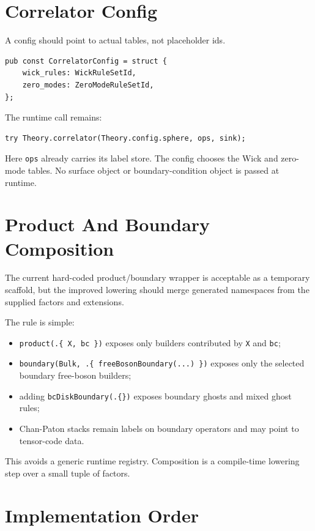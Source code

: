 \documentclass[11pt]{article}
\begin{document}
\section{Correlator Config}
\label{sec:orgd717ccc}

A config should point to actual tables, not placeholder ids.

\begin{verbatim}
pub const CorrelatorConfig = struct {
    wick_rules: WickRuleSetId,
    zero_modes: ZeroModeRuleSetId,
};
\end{verbatim}

The runtime call remains:

\begin{verbatim}
try Theory.correlator(Theory.config.sphere, ops, sink);
\end{verbatim}

Here \texttt{ops} already carries its label store.  The config chooses the Wick and
zero-mode tables.  No surface object or boundary-condition object is passed at
runtime.
\section{Product And Boundary Composition}
\label{sec:orgd61e59b}

The current hard-coded product/boundary wrapper is acceptable as a temporary
scaffold, but the improved lowering should merge generated namespaces from the
supplied factors and extensions.

The rule is simple:

\begin{itemize}
\item \texttt{product(.\{ X, bc \})} exposes only builders contributed by \texttt{X} and \texttt{bc};
\item \texttt{boundary(Bulk, .\{ freeBosonBoundary(...) \})} exposes only the selected
boundary free-boson builders;
\item adding \texttt{bcDiskBoundary(.\{\})} exposes boundary ghosts and mixed ghost rules;
\item Chan-Paton stacks remain labels on boundary operators and may point to
tensor-code data.
\end{itemize}

This avoids a generic runtime registry.  Composition is a compile-time lowering
step over a small tuple of factors.
\section{Implementation Order}
\label{sec:orgc2c2dcb}
\end{document}
